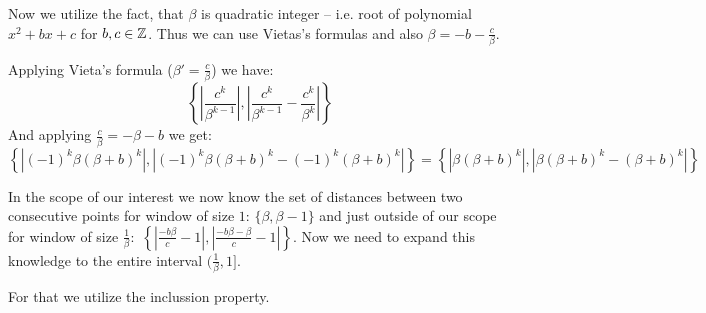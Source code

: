 \documentclass[text.tex]{subfiles}
\begin{document}
Now we utilize the fact, that $\beta$ is quadratic integer -- i.e. root of polynomial $x^2+bx+c$ for $b,c\in\mathbb{Z}$. Thus we can use Vietas's formulas and also $\beta = -b-\frac{c}{\beta}$. 

Applying Vieta's formula ($\beta' = \frac{c}{\beta}$) we have:
$$\left\{\left|\frac{c^k}{\beta^{k-1}}\right|, \left|\frac{c^k}{\beta^{k-1}}-\frac{c^k}{\beta^{k}}\right|\right\}$$
And applying $\frac{c}{\beta}=-\beta-b$ we get:
$$\left\{\left|(-1)^k\beta(\beta+b)^k\right|, \left|(-1)^k\beta(\beta+b)^k-(-1)^k(\beta+b)^k\right|\right\} = \left\{\left|\beta(\beta+b)^k\right|, \left|\beta(\beta+b)^k-(\beta+b)^k\right|\right\}$$

In the scope of our interest we now know the set of distances between two consecutive points for window of size $1$: $\{\beta, \beta - 1\}$ and just outside of our scope for window of size $\frac{1}{\beta}$:~$\left\{\left|\frac{-b\beta}{c}-1\right|, \left|\frac{-b\beta-\beta}{c} - 1\right|\right\}$. Now we need to expand this knowledge to the entire interval $(\frac{1}{\beta},1]$. %

For that we utilize the inclussion property. 
\end{document}
